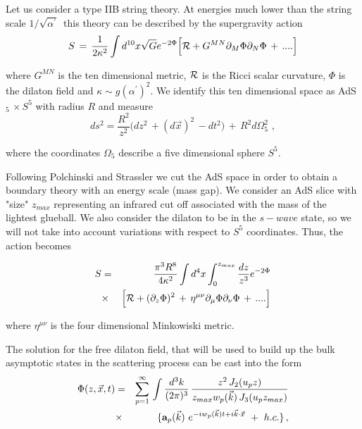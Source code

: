 \documentclass[a4paper,twocolumn,prd,groupedaddress,nofootinbib]{revtex4}
\begin{document}
Let us consider a type IIB string theory. At energies much lower than 
the string scale $1/\sqrt{\alpha^\prime}\,$ this theory can be described  
by  the supergravity action\cite{GKP,Po}
\begin{equation}
S \,=\, {1\over 2 \kappa^2} \int d^{10}x \sqrt{G} e^{-2\Phi} \Big[
{\cal R} + G^{MN} \partial_M \Phi \partial_N \Phi  \,+\, ....\Big]
\end{equation}

\noindent 
where $G^{MN}$ is the ten dimensional metric, ${\cal R}$ is the Ricci 
scalar curvature,  $\Phi$ is the dilaton field and 
$\kappa \sim g (\alpha^\prime)^2 $. 
We  identify this ten dimensional space as AdS$_{5}\,\times S^5$
with radius $R$ and measure
\begin{equation}
\label{metric}
ds^2=\frac {R^2 }{ z^2}\Big( dz^2 \,+(d\vec x)^2\,
- dt^2 \Big) \,+ \,R^2 d\Omega_5^2 \,\,,
 \end{equation}

\noindent 
where the coordinates $\Omega_5$ describe a five dimensional sphere
$S^5$.  

Following Polchinski and Strassler \cite{PS} we cut the AdS space 
in order to obtain a boundary theory with an energy scale (mass gap).
We consider an AdS slice with "size" $z_{max}$ representing an 
infrared cut off associated with the mass of the lightest glueball.  
We also consider the dilaton to be in the $s-wave$ state, 
so we will not take 
into account variations with respect to $S^5$ coordinates. 
Thus, the action becomes 

\begin{eqnarray}
\label{Action}
S &=& {\pi^3 R^8 \over 4 \kappa^2} \int d^4x \int_0^{z_{max}} {dz\over z^3} 
 e^{-2\Phi}\nonumber\\
 &\times& \Big[
{\cal R} + ( \partial_z \Phi )^2 \,+\, \eta^{\mu\nu} \partial_\mu \Phi  
\partial_\nu \Phi\,+\, ....\Big]
\end{eqnarray}

\noindent where $\eta^{\mu\nu}$ is the four dimensional Minkowiski metric.
 
The solution for the free dilaton field, that will be used to build up 
the bulk asymptotic states in the scattering process can be cast 
into the form \cite{BB1}
\begin{eqnarray}
\label{QF}
\Phi(z,\vec x,t) &=& \sum_{p=1}^\infty \,
\int { d^3 k \over (2\pi)^{3}}\,
{z^{2} \,J_2 (u_p z ) \over z_{max} w_p(\vec k ) 
\,J_{3} (u_p z_{max} ) }\nonumber\\
&\times& \lbrace { {\bf a}_p(\vec k )\ }
 e^{-iw_p(\vec k ) t +i\vec k \cdot \vec x}\,
\,+\,\,h.c.\rbrace\,,
\end{eqnarray}
\end{document}
